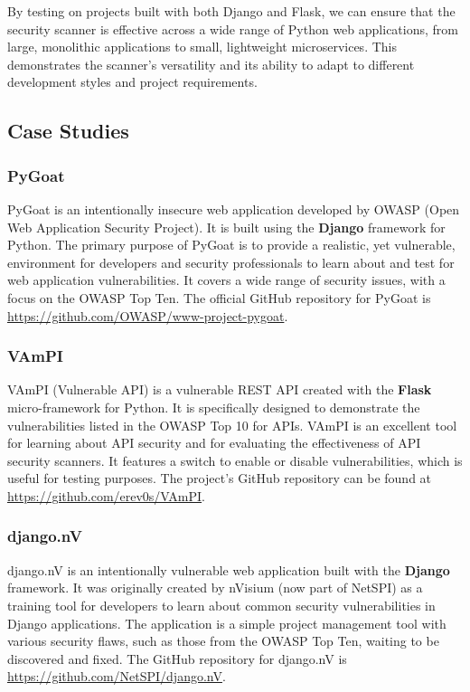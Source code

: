 By testing on projects built with both Django and Flask, we can ensure that the security scanner is effective across a wide range of Python web applications, from large, monolithic applications to small, lightweight microservices. This demonstrates the scanner's versatility and its ability to adapt to different development styles and project requirements.

\subsection{Case Studies}

\subsubsection{PyGoat}
PyGoat is an intentionally insecure web application developed by OWASP (Open Web Application Security Project). It is built using the \textbf{Django} framework for Python. The primary purpose of PyGoat is to provide a realistic, yet vulnerable, environment for developers and security professionals to learn about and test for web application vulnerabilities. It covers a wide range of security issues, with a focus on the OWASP Top Ten. The official GitHub repository for PyGoat is \url{https://github.com/OWASP/www-project-pygoat}.

\subsubsection{VAmPI}
VAmPI (Vulnerable API) is a vulnerable REST API created with the \textbf{Flask} micro-framework for Python. It is specifically designed to demonstrate the vulnerabilities listed in the OWASP Top 10 for APIs. VAmPI is an excellent tool for learning about API security and for evaluating the effectiveness of API security scanners. It features a switch to enable or disable vulnerabilities, which is useful for testing purposes. The project's GitHub repository can be found at \url{https://github.com/erev0s/VAmPI}.

\subsubsection{django.nV}
django.nV is an intentionally vulnerable web application built with the \textbf{Django} framework. It was originally created by nVisium (now part of NetSPI) as a training tool for developers to learn about common security vulnerabilities in Django applications. The application is a simple project management tool with various security flaws, such as those from the OWASP Top Ten, waiting to be discovered and fixed. The GitHub repository for django.nV is \url{https://github.com/NetSPI/django.nV}.

